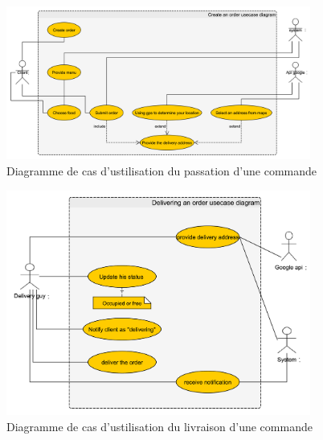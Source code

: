 \documentclass[french, a4paper, french]{report}
\begin{document}
			\begin{figure}[!h]
  				\center
  				\includegraphics[width=10cm]{usecaseorder.png}
  				\caption{Diagramme de cas d'ustilisation du passation d'une commande}
  				\label{fig:usecaseorder}
			\end{figure}
			
			\begin{figure}[!h]
  				\center
  				\includegraphics[width=10cm]{usecasedeliver.png}
  				\caption{Diagramme de cas d'ustilisation du livraison d'une commande}
  				\label{fig:usecasedeliver}
			\end{figure}
			\newpage
\end{document}
